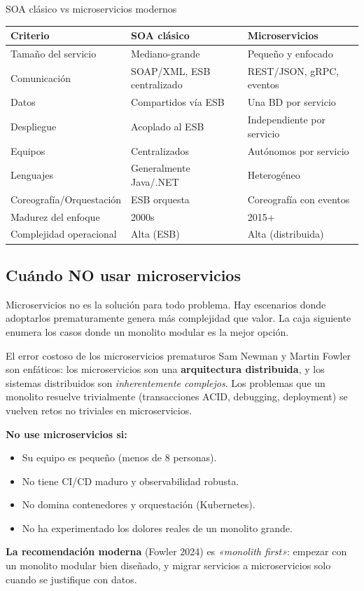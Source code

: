 \begin{cajacompara}{SOA clásico vs microservicios modernos}
\centering\footnotesize
\begin{tabularx}{\textwidth}{lXX}
\toprule
\textbf{Criterio} & \textbf{SOA clásico} & \textbf{Microservicios}\\
\midrule
Tamaño del servicio & Mediano-grande & Pequeño y enfocado\\
Comunicación & SOAP/XML, ESB centralizado & REST/JSON, gRPC, eventos\\
Datos & Compartidos vía ESB & Una BD por servicio\\
Despliegue & Acoplado al ESB & Independiente por servicio\\
Equipos & Centralizados & Autónomos por servicio\\
Lenguajes & Generalmente Java/.NET & Heterogéneo\\
Coreografía/Orquestación & ESB orquesta & Coreografía con eventos\\
Madurez del enfoque & 2000s & 2015+\\
Complejidad operacional & Alta (ESB) & Alta (distribuida)\\
\bottomrule
\end{tabularx}
\end{cajacompara}

\subsection{Cuándo NO usar microservicios}

Microservicios no es la solución para todo problema. Hay
escenarios donde adoptarlos prematuramente genera más complejidad
que valor. La caja siguiente enumera los casos donde un monolito
modular es la mejor opción.


\begin{cajaadvertencia}{El error costoso de los microservicios prematuros}
Sam Newman y Martin Fowler son enfáticos: los microservicios son
una \textbf{arquitectura distribuida}, y los sistemas distribuidos
son \emph{inherentemente complejos}. Los problemas que un monolito
resuelve trivialmente (transacciones ACID, debugging,
deployment) se vuelven retos no triviales en microservicios.

\textbf{No use microservicios si:}
\begin{itemize}
\item Su equipo es pequeño (menos de 8 personas).
\item No tiene CI/CD maduro y observabilidad robusta.
\item No domina contenedores y orquestación (Kubernetes).
\item No ha experimentado los dolores reales de un monolito grande.
\end{itemize}

\textbf{La recomendación moderna} (Fowler 2024) es \emph{«monolith
first»}: empezar con un monolito modular bien diseñado, y migrar
servicios a microservicios solo cuando se justifique con datos.
\end{cajaadvertencia}

